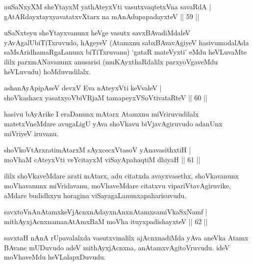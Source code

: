 
\begin{shl}
auSaNxyXM sheYtayxM yathA\s teyxVti vasutxvaqtetxVna savaRdA |\\
gAtARdayxtayxyavatatxvXtarx na mAnAdupapadayxteV \hfill || 59 ||
\end{shl}

\begin{artha}
uSaNxteyu sheYtayxvanunx heVge vasutx savxBAvadiMdaleV yAvAgalU\break biTiTxruvudo, hAgeyeV (Atamxnu sabxBAvavAgiyeV hasivu\break modalAda saMsAridhamaRgaLanunx biTiTxruvanu) `gataR mateVyxti' eMdu heVLuvaMte ililx parxmANavanunx anusarisi  (muKAyxthaRdalilx parxyoVgaveMdu heVLuvudu) hoMduvudilalx. 
\end{artha}

\begin{shl}
ashanAyApipAseV devxV Eva nAteyxVti keVvaleV |\\
shoVkashacx yasatxyoVbiVRjaM tamapeyxVSoV\s tivataRteV \hfill || 60 ||
\end{shl}

\begin{artha}
hasivu bAyArike I eraDanunx mAtarx Atamxnu miVriruvudilalx matetxVneMdare avugaLigU yAva shoVkavu biVjavAgiruvudo adanUnx miVriyeV iruvanu.
\end{artha}


\begin{shl}
shoVkoV\s tArxratimAtarxM sAyxcecxVtasoV yA\s navasithxtiH |\\
moVhaM cAteyxVti veYcitayxM viSayApahaqtiM dhiyaH \hfill || 61 ||
\end{shl}

\begin{artha}%
ililx shoVkaveMdare arati mAtarx, adu citatxda avayxvasethx, shoVkavanunx moVhavanunx miVridavanu, moVhaveMdare citatxvu vipariVtavAgiruvike, aMdare budidhxyu horagina viSayagaLanunx\break apaharisuvudu.
\end{artha}

\begin{shl}
savxtoV\s nAnAtamxkeV\s jAcnxnAdayxnAnxnAtamxsamiVkaSxNamf |\\
mithAyxjAcnxnamanAtAmxBaM moVha ituyxpadishayxteV \hfill || 62 ||
\end{shl}

\begin{artha}
savxtaH nAnA rUpavalalxda vasutxvinalilx ajAcnxnadiMda yAva aneVka Atamx BAvane mUDuvudo adeV mithAyxjAcnxna, anAtamxvAgi\break toVruvudu. ideV moVhaveMdu heVLalapxDuvudu.
\end{artha}

